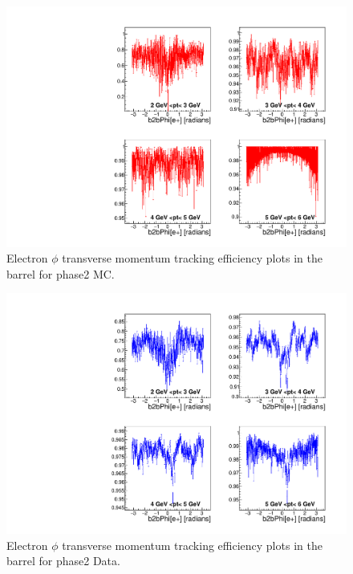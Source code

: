 \documentclass[a4paper,11pt,twosided,final,german,openbib,pdftex,listof=totoc,bibliography=totoc]{scrbook}
\begin{document}
\begin{appendix}
\clearpage

\begin{figure}[!htbp]
	\centering
	\includegraphics[width=\textwidth]{Plots/master/xPtMPhiemBarrel_MC}
	\caption[Transverse Momentum $\phi$ Electron Barrel Efficiency Phase2 MC]{Electron $\phi$ transverse momentum tracking efficiency plots in the barrel for phase2 MC.}
	\label{plt:PtMPhiemBarrel_MC}
\end{figure}


\begin{figure}[!htbp]
	\centering
	\includegraphics[width=\textwidth]{Plots/master/xPtMPhiemBarrel_Data}
	\caption[Transverse Momentum $\phi$ Electron Barrel Efficiency Phase2 Data]{Electron $\phi$ transverse momentum tracking efficiency plots in the barrel for phase2 Data.}
	\label{plt:PtMPhiemBarrel_Data}
\end{figure}




\end{appendix}
\end{document}
